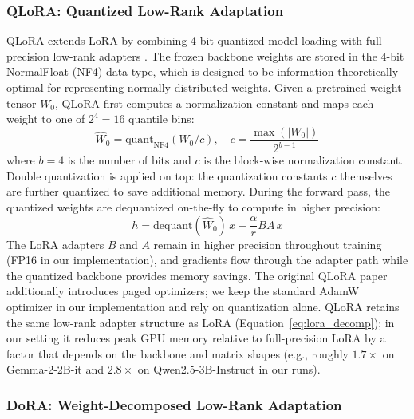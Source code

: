 \documentclass{article}
\begin{document}
\subsubsection{QLoRA: Quantized Low-Rank Adaptation}

QLoRA extends LoRA by combining 4-bit quantized model loading with full-precision low-rank adapters \cite{dettmers2023qlora}. The frozen backbone weights are stored in the 4-bit NormalFloat (NF4) data type, which is designed to be information-theoretically optimal for representing normally distributed weights. Given a pretrained weight tensor $W_0$, QLoRA first computes a normalization constant and maps each weight to one of $2^4 = 16$ quantile bins:
\begin{equation}
\label{eq:qlora_quant}
\hat{W}_0 = \text{quant}_{\text{NF4}}(W_0 / c), \quad c = \frac{\max(|W_0|)}{2^{b - 1}}
\end{equation}
where $b = 4$ is the number of bits and $c$ is the block-wise normalization constant. Double quantization is applied on top: the quantization constants $c$ themselves are further quantized to save additional memory. During the forward pass, the quantized weights are dequantized on-the-fly to compute in higher precision:
\begin{equation}
\label{eq:qlora_forward}
h = \text{dequant}(\hat{W}_0) \, x + \frac{\alpha}{r} BA \, x
\end{equation}
The LoRA adapters $B$ and $A$ remain in higher precision throughout training (FP16 in our implementation), and gradients flow through the adapter path while the quantized backbone provides memory savings. The original QLoRA paper additionally introduces paged optimizers; we keep the standard AdamW optimizer in our implementation and rely on quantization alone. QLoRA retains the same low-rank adapter structure as LoRA (Equation~\ref{eq:lora_decomp}); in our setting it reduces peak GPU memory relative to full-precision LoRA by a factor that depends on the backbone and matrix shapes (e.g., roughly $1.7\times$ on Gemma-2-2B-it and $2.8\times$ on Qwen2.5-3B-Instruct in our runs).

\subsubsection{DoRA: Weight-Decomposed Low-Rank Adaptation}
\end{document}
